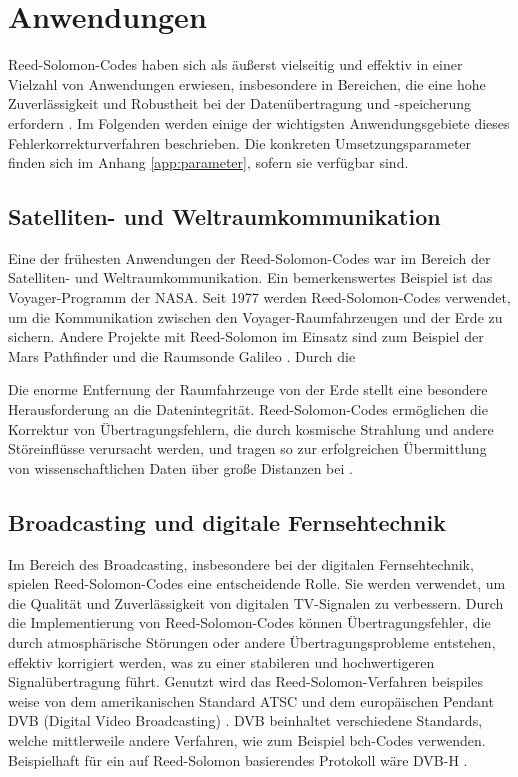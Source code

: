 \chapter{Anwendungen}\label{ch:application}

Reed-Solomon-Codes haben sich als äußerst vielseitig und effektiv in einer Vielzahl von Anwendungen erwiesen, insbesondere in Bereichen, die eine hohe Zuverlässigkeit und Robustheit bei der Datenübertragung und -speicherung erfordern \cite{WasIstReedSolomonVerfahren2022}. 
Im Folgenden werden einige der wichtigsten Anwendungsgebiete dieses Fehlerkorrekturverfahren beschrieben.
Die konkreten Umsetzungsparameter finden sich im Anhang \ref{app:parameter}, sofern sie verfügbar sind.

\section{Satelliten- und Weltraumkommunikation}

Eine der frühesten Anwendungen der Reed-Solomon-Codes war im Bereich der Satelliten- und Weltraumkommunikation. 
Ein bemerkenswertes Beispiel ist das Voyager-Programm der NASA. Seit 1977 werden Reed-Solomon-Codes verwendet, um die Kommunikation zwischen den Voyager-Raumfahrzeugen und der Erde zu sichern. 
Andere Projekte mit Reed-Solomon im Einsatz sind zum Beispiel der Mars Pathfinder und die Raumsonde Galileo \cite{wickerReedSolomonCodes1994}.
Durch die 

Die enorme Entfernung der Raumfahrzeuge von der Erde stellt eine besondere Herausforderung an die Datenintegrität. 
Reed-Solomon-Codes ermöglichen die Korrektur von Übertragungsfehlern, die durch kosmische Strahlung und andere Störeinflüsse verursacht werden, und tragen so zur erfolgreichen Übermittlung von wissenschaftlichen Daten über große Distanzen bei \cite{ludwigVoyagerTelecommunications2002}.

\section{Broadcasting und digitale Fernsehtechnik}

Im Bereich des Broadcasting, insbesondere bei der digitalen Fernsehtechnik, spielen Reed-Solomon-Codes eine entscheidende Rolle. 
Sie werden verwendet, um die Qualität und Zuverlässigkeit von digitalen TV-Signalen zu verbessern. 
Durch die Implementierung von Reed-Solomon-Codes können Übertragungsfehler, die durch atmosphärische Störungen oder andere Übertragungsprobleme entstehen, effektiv korrigiert werden, was zu einer stabileren und hochwertigeren Signalübertragung führt.
Genutzt wird das Reed-Solomon-Verfahren beispiles weise von dem amerikanischen Standard ATSC und dem europäischen Pendant DVB (Digital Video Broadcasting) \cite{ilievAnalysisEvaluationReedSolomon2008}.
DVB beinhaltet verschiedene Standards, welche mittlerweile andere Verfahren, wie zum Beispiel \acrshort{bch}-Codes verwenden. 
Beispielhaft für ein auf Reed-Solomon basierendes Protokoll wäre DVB-H \cite{DVBH2024}. 

